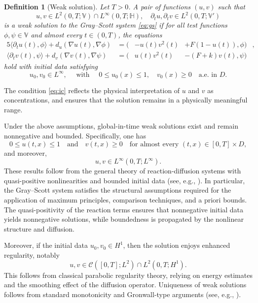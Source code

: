 \documentclass[11pt, a4paper]{amsart}
\newcommand{\la}{\langle}
\newcommand{\ra}{\rangle}
\newcommand{\mC}{\mathcal{C}}
\newcommand{\HH}{\mathbb{H}}
\newcommand{\VV}{\mathbb{V}}
\newtheorem{definition}{Definition}[section]
\numberwithin{equation}{section}
\begin{document}
	
	\begin{definition}[Weak solution]\label{def:weak_solution}
		Let $T>0$. A pair of functions $(u,v)$ such that
		\[
		u, v \in L^2(0,T; \VV) \cap L^\infty(0,T;\HH), \quad 
		\partial_t u, \partial_t v \in L^2(0,T; \VV')
		\]
		is a weak solution to the Gray--Scott system \eqref{eq:gs} if for all test functions $\phi, \psi \in \VV$ and almost every $t \in (0, T)$, the equations
		\begin{alignat}{5}
			\label{eq:weak_v}
			\la \partial_t u(t), \phi \ra + d_u (\nabla u(t), \nabla \phi ) 
			&=    (&-u(t)v^2(t) &+ F(1 - u(t)), \phi)& ,  
			\\
			\label{eq:weak_u}
			\la \partial_t v(t), \psi \rangle + d_v  (\nabla v(t), \nabla \psi) 
			&= (&u(t)v^2(t) &- (F + k)v(t), \psi) &
		\end{alignat}
		hold with initial data satisfying
		\begin{equation}\label{eq:ic}
			u_0,v_0\in L^\infty,\quad\mbox{ with }\quad 0\leq u_0(x)\leq 1,\quad v_0(x)\geq 0\quad\mbox{a.e. in }D. 
		\end{equation}
	\end{definition}

	The condition \eqref{eq:ic} reflects the physical interpretation of $u$ and $v$ as concentrations, and ensures that the solution remains in a physically meaningful range.
	
	Under the above assumptions, global-in-time weak solutions exist and remain nonnegative and bounded. Specifically, one has
	\[
	0 \leq u(t,x) \leq 1 \quad \text{and} \quad v(t,x) \geq 0 \quad \text{for almost every } (t,x) \in [0,T] \times D,
	\]
	and moreover,
	\[
	u, v \in L^\infty(0,T;L^\infty).
	\]
	These results follow from the general theory of reaction-diffusion systems with quasi-positive nonlinearities and bounded initial data (see, e.g., \cite{amann1989dynamic,pierre2010global, souplet2006global}). In particular, the Gray--Scott system satisfies the structural assumptions required for the application of maximum principles, comparison techniques, and a priori bounds. The quasi-positivity of the reaction terms ensures that nonnegative initial data yields nonnegative solutions, while boundedness is propagated by the nonlinear structure and diffusion.
	
	Moreover, if the initial data $u_0, v_0 \in H^1$, then the solution enjoys enhanced regularity, notably
	\[
	u, v \in \mC([0,T];L^2) \cap L^2(0,T;H^1).
	\]
	This follows from classical parabolic regularity theory, relying on energy estimates and the smoothing effect of the diffusion operator.
	Uniqueness of weak solutions follows from standard monotonicity and Gronwall-type arguments (see, e.g., \cite{henry1981geometric, pierre2010global}).
	
\end{document}
